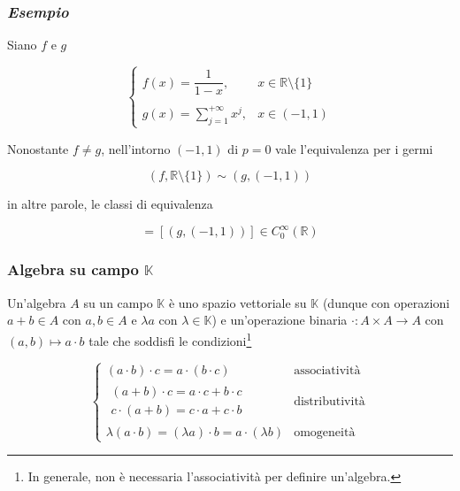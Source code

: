\subsubsection{\textit{Esempio}}

Siano $ f $ e $ g $

\begin{equation}
	\begin{cases}
		f(x) = \dfrac{1}{1-x}, & x \in \mathbb{R} \setminus \{1\}\\\\
		g(x) = \sum_{j=1}^{+\infty} x^{j}, & x \in (-1,1)
	\end{cases}
\end{equation}

Nonostante $ f\neq g $, nell'intorno $ (-1,1) $ di $ p=0 $ vale l'equivalenza per i germi

\begin{equation}
	(f,\mathbb{R} \setminus \{1\}) \sim (g,(-1,1))
\end{equation}

in altre parole, le classi di equivalenza

\begin{equation}
	[(f,\mathbb{R} \setminus \{1\})] = [(g,(-1,1))] \in C_{0}^{\infty}(\mathbb{R})
\end{equation}

\subsubsection{Algebra su campo $ \mathbb{K} $}

Un'algebra $ A $ su un campo $ \mathbb{K} $ è uno spazio vettoriale su $ \mathbb{K} $ (dunque con operazioni $ a+b \in A $ con $ a,b \in A $ e $ \lambda a $ con $ \lambda \in \mathbb{K} $) e un'operazione binaria $ \cdot : A \times A \to A $ con $ (a,b) \mapsto a \cdot b $ tale che soddisfi le condizioni\footnote{%
	In generale, non è necessaria l'associatività per definire un'algebra.}

\begin{equation}
	\begin{cases}
		(a \cdot b) \cdot c = a \cdot (b \cdot c) & \text{associatività}\\
		\begin{split}
			(a + b) \cdot c = a \cdot c + b \cdot c\\
			c \cdot (a + b) = c \cdot a + c \cdot b
		\end{split} & \text{distributività}\\
	\lambda (a \cdot b) = (\lambda a) \cdot b = a \cdot (\lambda b) & \text{omogeneità}
	\end{cases}
\end{equation}


